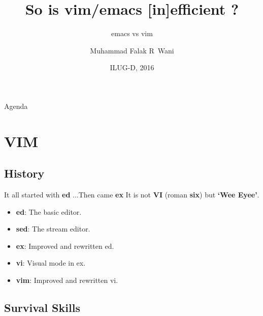 \documentclass{beamer}
\title{So is vim/emacs [in]efficient ?}
\subtitle{emacs vs vim}
\author{Muhammad Falak R~Wani
}
\institute[IIIT-D] %
{
	\inst{}%
  Department of Computer Science\\
  IIIT-D
}
\date{ILUG-D, 2016}
\begin{document}
\begin{frame}
	\titlepage
\end{frame}

\begin{frame}{Agenda}
	\tableofcontents
\end{frame}

\section{VIM}

\subsection{History}

\begin{frame}{It all started with \textbf{ed} ...}{Then came \textbf{ex}}
It is not \textbf{VI} (roman \textbf{six}) but \textbf{`Wee Eyee'}.\\
\pause
	\begin{itemize}
		\item {
				\textbf{ed}: The basic editor.
				\pause

			}
		\item {
				\textbf{sed}: The stream editor.
				\pause

			}
		\item {
				\textbf{ex}: Improved and rewritten ed.
				\pause
			}
					\item {
				\textbf{vi}: Visual mode in ex.
				\pause
			}
					\item {
				\textbf{vim}: Improved and rewritten vi.
				
			}
	\end{itemize}
\end{frame}

\subsection{Survival Skills}
\end{document}
